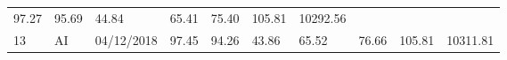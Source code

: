 \documentclass[
  11pt,
]{article}
\begin{document}
\begin{longtable}[]{@{}llllllllll@{}}
\begin{minipage}[t]{0.07\columnwidth}
97.27\strut
\end{minipage} & \begin{minipage}[t]{0.07\columnwidth}\raggedright
95.69\strut
\end{minipage} & \begin{minipage}[t]{0.07\columnwidth}\raggedright
44.84\strut
\end{minipage} & \begin{minipage}[t]{0.07\columnwidth}\raggedright
65.41\strut
\end{minipage} & \begin{minipage}[t]{0.07\columnwidth}\raggedright
75.40\strut
\end{minipage} & \begin{minipage}[t]{0.08\columnwidth}\raggedright
105.81\strut
\end{minipage} & \begin{minipage}[t]{0.09\columnwidth}\raggedright
10292.56\strut
\end{minipage}\tabularnewline
\begin{minipage}[t]{0.05\columnwidth}\raggedright
13\strut
\end{minipage} & \begin{minipage}[t]{0.07\columnwidth}\raggedright
AI\strut
\end{minipage} & \begin{minipage}[t]{0.11\columnwidth}\raggedright
04/12/2018\strut
\end{minipage} & \begin{minipage}[t]{0.07\columnwidth}\raggedright
97.45\strut
\end{minipage} & \begin{minipage}[t]{0.07\columnwidth}\raggedright
94.26\strut
\end{minipage} & \begin{minipage}[t]{0.07\columnwidth}\raggedright
43.86\strut
\end{minipage} & \begin{minipage}[t]{0.07\columnwidth}\raggedright
65.52\strut
\end{minipage} & \begin{minipage}[t]{0.07\columnwidth}\raggedright
76.66\strut
\end{minipage} & \begin{minipage}[t]{0.08\columnwidth}\raggedright
105.81\strut
\end{minipage} & \begin{minipage}[t]{0.09\columnwidth}\raggedright
10311.81\strut
\end{minipage}\tabularnewline

\end{longtable}
\end{document}
